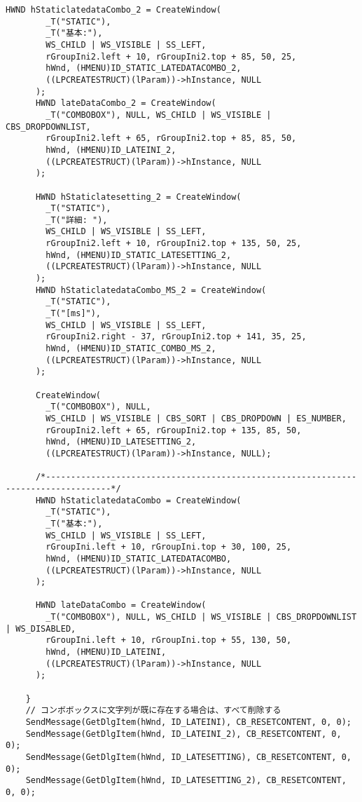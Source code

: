 \begin{lstlisting}[caption=window.cpp]
      HWND hStaticlatedataCombo_2 = CreateWindow(
        _T("STATIC"),
        _T("基本:"),
        WS_CHILD | WS_VISIBLE | SS_LEFT,
        rGroupIni2.left + 10, rGroupIni2.top + 85, 50, 25,
        hWnd, (HMENU)ID_STATIC_LATEDATACOMBO_2,
        ((LPCREATESTRUCT)(lParam))->hInstance, NULL
      );
      HWND lateDataCombo_2 = CreateWindow(
        _T("COMBOBOX"), NULL, WS_CHILD | WS_VISIBLE | CBS_DROPDOWNLIST,
        rGroupIni2.left + 65, rGroupIni2.top + 85, 85, 50,
        hWnd, (HMENU)ID_LATEINI_2,
        ((LPCREATESTRUCT)(lParam))->hInstance, NULL
      );

      HWND hStaticlatesetting_2 = CreateWindow(
        _T("STATIC"),
        _T("詳細: "),
        WS_CHILD | WS_VISIBLE | SS_LEFT,
        rGroupIni2.left + 10, rGroupIni2.top + 135, 50, 25,
        hWnd, (HMENU)ID_STATIC_LATESETTING_2,
        ((LPCREATESTRUCT)(lParam))->hInstance, NULL
      );
      HWND hStaticlatedataCombo_MS_2 = CreateWindow(
        _T("STATIC"),
        _T("[ms]"),
        WS_CHILD | WS_VISIBLE | SS_LEFT,
        rGroupIni2.right - 37, rGroupIni2.top + 141, 35, 25,
        hWnd, (HMENU)ID_STATIC_COMBO_MS_2,
        ((LPCREATESTRUCT)(lParam))->hInstance, NULL
      );

      CreateWindow(
        _T("COMBOBOX"), NULL,
        WS_CHILD | WS_VISIBLE | CBS_SORT | CBS_DROPDOWN | ES_NUMBER,
        rGroupIni2.left + 65, rGroupIni2.top + 135, 85, 50,
        hWnd, (HMENU)ID_LATESETTING_2,
        ((LPCREATESTRUCT)(lParam))->hInstance, NULL);

      /*-----------------------------------------------------------------------------------*/
      HWND hStaticlatedataCombo = CreateWindow(
        _T("STATIC"),
        _T("基本:"),
        WS_CHILD | WS_VISIBLE | SS_LEFT,
        rGroupIni.left + 10, rGroupIni.top + 30, 100, 25,
        hWnd, (HMENU)ID_STATIC_LATEDATACOMBO,
        ((LPCREATESTRUCT)(lParam))->hInstance, NULL
      );

      HWND lateDataCombo = CreateWindow(
        _T("COMBOBOX"), NULL, WS_CHILD | WS_VISIBLE | CBS_DROPDOWNLIST | WS_DISABLED,
        rGroupIni.left + 10, rGroupIni.top + 55, 130, 50,
        hWnd, (HMENU)ID_LATEINI,
        ((LPCREATESTRUCT)(lParam))->hInstance, NULL
      );

    }
    // コンボボックスに文字列が既に存在する場合は、すべて削除する
    SendMessage(GetDlgItem(hWnd, ID_LATEINI), CB_RESETCONTENT, 0, 0);
    SendMessage(GetDlgItem(hWnd, ID_LATEINI_2), CB_RESETCONTENT, 0, 0);
    SendMessage(GetDlgItem(hWnd, ID_LATESETTING), CB_RESETCONTENT, 0, 0);
    SendMessage(GetDlgItem(hWnd, ID_LATESETTING_2), CB_RESETCONTENT, 0, 0);


\end{lstlisting}

